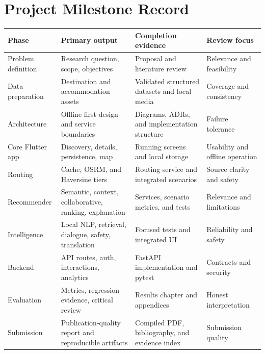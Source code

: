 \section{Project Milestone Record}
\begin{longtable}{p{2.9cm}p{3.5cm}p{4.8cm}p{2.4cm}}
\toprule
\textbf{Phase} & \textbf{Primary output} & \textbf{Completion evidence} & \textbf{Review focus} \\
\midrule
Problem definition & Research question, scope, objectives & Proposal and literature review & Relevance and feasibility \\
Data preparation & Destination and accommodation assets & Validated structured datasets and local media & Coverage and consistency \\
Architecture & Offline-first design and service boundaries & Diagrams, ADRs, and implementation structure & Failure tolerance \\
Core Flutter app & Discovery, details, persistence, map & Running screens and local storage & Usability and offline operation \\
Routing & Cache, OSRM, and Haversine tiers & Routing service and integrated scenarios & Source clarity and safety \\
Recommender & Semantic, context, collaborative, ranking, explanation & Services, scenario metrics, and tests & Relevance and limitations \\
Intelligence & Local NLP, retrieval, dialogue, safety, translation & Focused tests and integrated UI & Reliability and safety \\
Backend & API routes, auth, interactions, analytics & FastAPI implementation and pytest & Contracts and security \\
Evaluation & Metrics, regression evidence, critical review & Results chapter and appendices & Honest interpretation \\
Submission & Publication-quality report and reproducible artifacts & Compiled PDF, bibliography, and evidence index & Submission quality \\
\bottomrule
\end{longtable}

\clearpage
